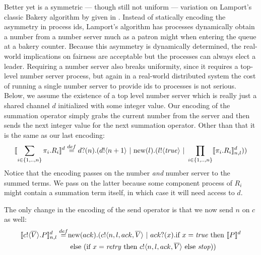 Better yet is a symmetric --- though still not uniform --- variation on Lamport's classic Bakery algorithm  by given in \cite{nest00}.
Instead of statically encoding the asymmetry in process ids, Lamport's algorithm has processes dynamically obtain a number from a number server much as a patron might when entering the queue at a bakery counter.
Because this asymmetry is dynamically determined, the real-world implications on fairness are acceptable but the processes can always elect a leader.
Requiring a number server also breaks uniformity, since it requires a top-level number server process, but again in a real-world distributed system the cost of running a single number server to provide ids to processes is not serious.  
Below, we assume the existence of a top level number server which is really just a shared channel $d$ initialized with some integer value.  
Our encoding of the summation operator simply grabs the current number from the server and then sends the next integer value for the next summation operator.  
Other than that it is the same as our last encoding:
\[
	\llbracket{\displaystyle\sum_{i\in \{1,..,n\}} \pi_i.R_i}\rrbracket^d \overset{\tiny{def}}{=} {d}?({n}).({d}!\langle{n+1}\rangle \ |\  \text{new}({l}).({l}!\langle{ \ensuremath{\text{\emph{true}}} }\rangle \ |\  \displaystyle\prod_{i\in \{1,..,n\}}\llbracket{\pi_i.R_i}\rrbracket^d_{n,l}))
\]
Notice that the encoding passes on the number \emph{and} number server to the summed terms.  
We pass on the latter because some component process of $R_i$ might contain a summation term itself, in which case it will need access to $d$.

The only change in the encoding of the send operator is that we now send $n$ on $c$ as well:
\begin{equation*}\begin{split}
	\llbracket{ \ensuremath{{c}!\langle{ \ensuremath{\overline{V}} }\rangle.} P}\rrbracket^d_{n,l} \overset{\tiny{def}}{=} & \text{new}({ack}).({c}!\langle{n,l,ack, \ensuremath{\overline{V}} }\rangle \ |\  {ack}?({x}). \text{if } {x= \ensuremath{\text{\emph{true}}} } \text{ then } \llbracket{P}\rrbracket^d \\
	&\text{ else } (\text{if } {x= \ensuremath{\text{\emph{retry}}} } \text{ then } {c}!\langle{n,l,ack, \ensuremath{\overline{V}} }\rangle \text{ else } \mbox{\emph{stop}}))
\end{split}\end{equation*}

